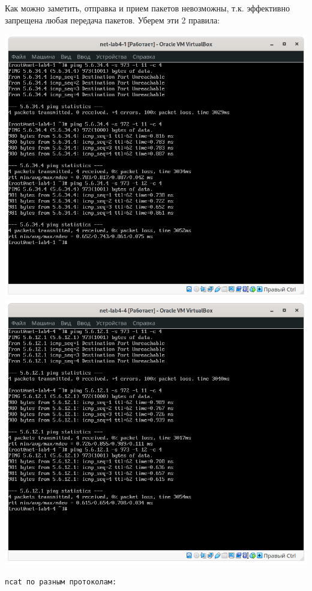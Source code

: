 Как можно заметить, отправка и прием пакетов невозможны,
т.к. эффективно запрещена любая передача пакетов.
Уберем эти 2 правила:

\begin{center}
    \includegraphics[width=.49\textwidth]{screenshots/base-ping-iptables-A}
    \includegraphics[width=.49\textwidth]{screenshots/base-ping-iptables-B}
\end{center}

\texttt{\texttt{ncat} по разным протоколам:}


